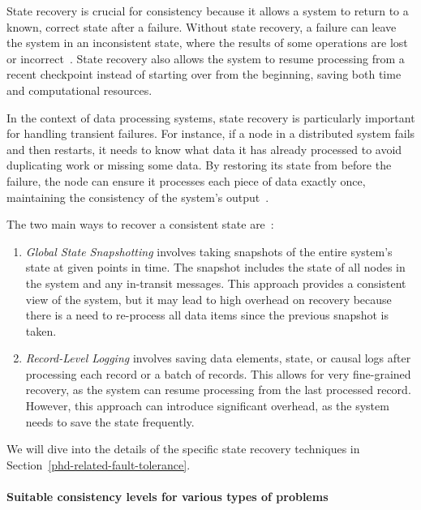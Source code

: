 State recovery is crucial for consistency because it allows a system to return to a known, correct state after a failure. Without state recovery, a failure can leave the system in an inconsistent state, where the results of some operations are lost or incorrect~\cite{Carbone:2017:SMA:3137765.3137777, Akidau:2013:MFS:2536222.2536229}. State recovery also allows the system to resume processing from a recent checkpoint instead of starting over from the beginning, saving both time and computational resources.

In the context of data processing systems, state recovery is particularly important for handling transient failures. For instance, if a node in a distributed system fails and then restarts, it needs to know what data it has already processed to avoid duplicating work or missing some data. By restoring its state from before the failure, the node can ensure it processes each piece of data exactly once, maintaining the consistency of the system's output~\cite{silvestre2021clonos, Carbone:2017:SMA:3137765.3137777, wang2021consistency}.

The two main ways to recover a consistent state are~\cite{fragkoulis2024survey, zhang2024survey}:

\begin{enumerate}
    \item {\em Global State Snapshotting} involves taking snapshots of the entire system's state at given points in time. The snapshot includes the state of all nodes in the system and any in-transit messages. This approach provides a consistent view of the system, but it may lead to high overhead on recovery because there is a need to re-process all data items since the previous snapshot is taken.
    \item {\em Record-Level Logging} involves saving data elements, state, or causal logs after processing each record or a batch of records. This allows for very fine-grained recovery, as the system can resume processing from the last processed record. However, this approach can introduce significant overhead, as the system needs to save the state frequently.
\end{enumerate}

We will dive into the details of the specific state recovery techniques in Section~\ref{phd-related-fault-tolerance}.

\paragraph{Suitable consistency levels for various types of problems}\mbox{} \\

